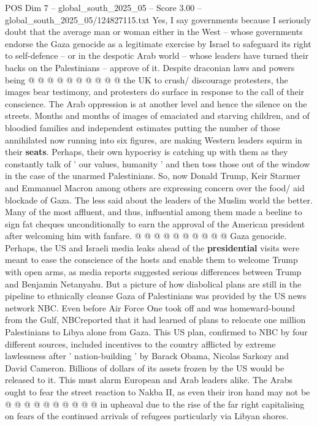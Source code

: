\begin{textsample}{POS Dim 7 – global\_south\_2025\_05 – Score 3.00 – global\_south\_2025\_05/124827115.txt}
Yes, I say governments because I seriously doubt that the average man or woman either in the West -- whose governments endorse the Gaza genocide as a legitimate exercise by Israel to safeguard its right to self-defence -- or in the despotic Arab world -- whose leaders have turned their backs on the Palestinians -- approve of it.
Despite draconian laws and powers being @ @ @ @ @ @ @ @ @ @ the UK to crush/ discourage protesters, the images bear testimony, and protesters do surface in response to the call of their conscience.
The Arab oppression is at another level and hence the silence on the streets.
Months and months of images of emaciated and starving children, and of bloodied families and independent estimates putting the number of those annihilated now running into six figures, are making Western leaders squirm in their \textbf{seats}.
Perhaps, their own hypocrisy is catching up with them as they constantly talk of ' our values, humanity ' and then toss those out of the window in the case of the unarmed Palestinians.
So, now Donald Trump, Keir Starmer and Emmanuel Macron among others are expressing concern over the food/ aid blockade of Gaza.
The less said about the leaders of the Muslim world the better.
Many of the most affluent, and thus, influential among them made a beeline to sign fat cheques unconditionally to earn the approval of the American president after welcoming him with fanfare. @ @ @ @ @ @ @ @ @ @ Gaza genocide.
Perhaps, the US and Israeli media leaks ahead of the \textbf{presidential} visits were meant to ease the conscience of the hosts and enable them to welcome Trump with open arms, as media reports suggested serious differences between Trump and Benjamin Netanyahu.
But a picture of how diabolical plans are still in the pipeline to ethnically cleanse Gaza of Palestinians was provided by the US news network NBC.
Even before Air Force One took off and was homeward-bound from the Gulf, NBCreported that it had learned of plans to relocate one million Palestinians to Libya alone from Gaza.
This US plan, confirmed to NBC by four different sources, included incentives to the country afflicted by extreme lawlessness after ' nation-building ' by Barack Obama, Nicolas Sarkozy and David Cameron.
Billions of dollars of its assets frozen by the US would be released to it.
This must alarm European and Arab leaders alike.
The Arabs ought to fear the street reaction to Nakba II, as even their iron hand may not be @ @ @ @ @ @ @ @ @ @ in upheaval due to the rise of the far right capitalising on fears of the continued arrivals of refugees particularly via Libyan shores.

\end{textsample}
